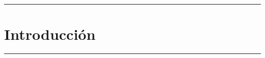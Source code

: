
  \thispagestyle{empty}


    \begin{minipage}{0.85\textwidth}
    \end{minipage}%

    \vspace{14cm}
    \begin{minipage}{0.85\textwidth}
      \begin{center}
          \sffamily
          
          \rule{\textwidth}{0.2mm}
          \chapter{Introducción}
          \rule{\textwidth}{0.2mm}\\
      \end{center}
    \end{minipage}%
    

